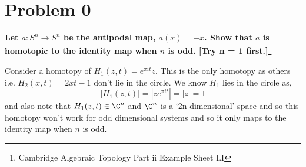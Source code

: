 
\section{Problem 0}
\begin{exercise}
  \textbf{Let $a : S^n \to S^n$ be the antipodal map, $a(x) = -x$. Show that $a$ is homotopic to the identity map when $n$ is odd. [Try n = 1 first.]}\footnote{Cambridge Algebraic Topology Part ii Example Sheet I.I}
\end{exercise}

\begin{solution}
  Consider a homotopy of $H_1(z, t) = e^{\pi i t}z$. This is the only homotopy as others i.e. $H_2(x, t) = 2xt - 1$ don't lie in the circle. We know $H_1$ lies in the circle as,
  $$ |H_1(z, t)| = |ze^{\pi it}| = |z| = 1 $$
  and also note that $H_1(z, t) \in \C^n$ and $\C^n$ is a `2n-dimensional' space and so this homotopy won't work for odd dimensional systems and so it only maps to the identity map when $n$ is odd.
\end{solution}
